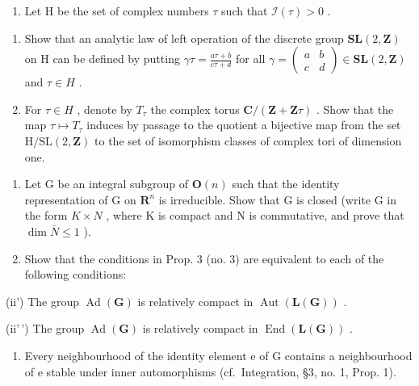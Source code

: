 \begin{enumerate}
\def\labelenumi{\arabic{enumi})}
\setcounter{enumi}{1}
\tightlist
\item
  Let H be the set of complex numbers \(\tau\) such that \(\mathcal{I}(\tau) > 0\) .
\end{enumerate}

\begin{enumerate}
\def\labelenumi{\alph{enumi})}
\item
  Show that an analytic law of left operation of the discrete group \(\mathbf{SL}(2,\mathbf{Z})\) on H can be defined by putting \(\gamma\tau=\frac{a\tau+b}{c\tau+d}\) for all \(\gamma=\begin{pmatrix}a&b\\ c&d\end{pmatrix}\in\mathbf{SL}(2,\mathbf{Z})\) and \(\tau\in H\) .
\item
  For \(\tau\in H\) , denote by \(T_{\tau}\) the complex torus \(\mathbf{C}/(\mathbf{Z}+\mathbf{Z}\tau)\) . Show that the map \(\tau\mapsto T_{\tau}\) induces by passage to the quotient a bijective map from the set \(\mathrm{H}/\mathrm{SL}(2,\mathbf{Z})\) to the set of isomorphism classes of complex tori of dimension one.
\end{enumerate}

\begin{enumerate}
\def\labelenumi{\arabic{enumi})}
\setcounter{enumi}{2}
\item
  Let G be an integral subgroup of \(\mathbf{O}(n)\) such that the identity representation of G on \(\mathbf{R}^{n}\) is irreducible. Show that G is closed (write G in the form \(K \times N\) , where K is compact and N is commutative, and prove that \(\dim \overline{N} \leq 1\) ).
\item
  Show that the conditions in Prop. 3 (no. 3) are equivalent to each of the following conditions:
\end{enumerate}

(ii') The group \(\operatorname{Ad}(\mathbf{G})\) is relatively compact in \(\operatorname{Aut}(\mathbf{L}(\mathbf{G}))\) .

(ii'\,') The group \(\operatorname{Ad}(\mathbf{G})\) is relatively compact in \(\operatorname{End}(\mathbf{L}(\mathbf{G}))\) .

\begin{enumerate}
\def\labelenumi{(\alph{enumi})}
\setcounter{enumi}{21}
\tightlist
\item
  Every neighbourhood of the identity element e of G contains a neighbourhood of e stable under inner automorphisms (cf.~Integration, §3, no. 1, Prop. 1).
\end{enumerate}

